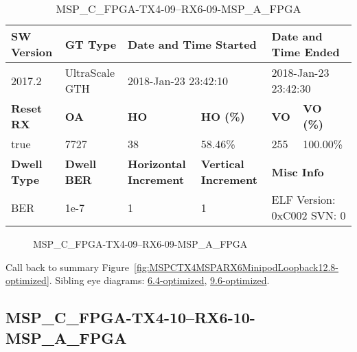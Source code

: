 \begin{table}[h]
\centering
\caption{MSP\_C\_FPGA-TX4-09--RX6-09-MSP\_A\_FPGA}
\label{tab:MSPCFPGATX409RX609MSPAFPGA12.8-optimized}
\begin{tabular}{@{}|l|l|l|l|l|l|@{}}
\toprule
\textbf{SW Version}                & \textbf{GT Type}   & \multicolumn{2}{l|}{\textbf{Date and Time Started}}            & \multicolumn{2}{l|}{\textbf{Date and Time Ended}}        \\ \midrule
2017.2                       & UltraScale GTH          & \multicolumn{2}{l|}{2018-Jan-23 23:42:10}                   & \multicolumn{2}{l|}{2018-Jan-23 23:42:30}               \\ \midrule
\textbf{Reset RX}                  & \textbf{OA} & \textbf{HO}   & \textbf{HO (\%)} & \textbf{VO} & \textbf{VO (\%)} \\ \midrule
true & 7727        & 38          & 58.46\%        & 255        & 100.00\%       \\ \midrule
\textbf{Dwell Type}                & \textbf{Dwell BER} & \textbf{Horizontal Increment} & \textbf{Vertical Increment}    & \multicolumn{2}{l|}{\textbf{Misc Info}}                  \\ \midrule
BER                            & 1e-7        & 1        & 1           & \multicolumn{2}{l|}{ELF Version: 0xC002 SVN: 0}                         \\ \bottomrule
\end{tabular}
\end{table}

\begin{figure}[h]
\caption{MSP\_C\_FPGA-TX4-09--RX6-09-MSP\_A\_FPGA} \label{fig:MSPCFPGATX409RX609MSPAFPGA12.8-optimized}
\end{figure}

Call back to summary Figure~\ref{fig:MSPCTX4MSPARX6MinipodLoopback12.8-optimized}.
Sibling eye diagrams: \hyperref[sec:MSPCFPGATX409RX609MSPAFPGA6.4-optimized]{6.4-optimized}, \hyperref[sec:MSPCFPGATX409RX609MSPAFPGA9.6-optimized]{9.6-optimized}.

\clearpage
\newpage


\subsection{MSP\_C\_FPGA-TX4-10--RX6-10-MSP\_A\_FPGA}\label{sec:MSPCFPGATX410RX610MSPAFPGA12.8-optimized}

